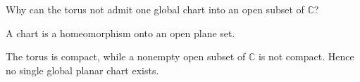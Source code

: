 \begin{exercise}\label{exr:iv27-expand-16}
Why can the torus not admit one global chart into an open subset of \(\mathbb C\)?
\end{exercise}
\begin{hint}
A chart is a homeomorphism onto an open plane set.
\end{hint}
\begin{solution}
The torus is compact, while a nonempty open subset of \(\mathbb C\) is not compact. Hence no single global planar chart exists.
\end{solution}

